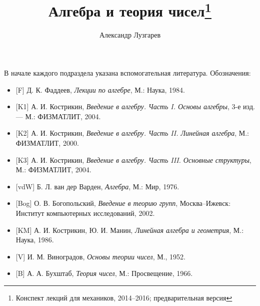 \documentclass[12pt]{article}
\theoremstyle{plain}
\theoremstyle{remark}
\theoremstyle{definition}
\begin{document}
\title{Алгебра и теория чисел\footnote{Конспект
    лекций для механиков, 2014--2016; предварительная
    версия}}
\author{Александр Лузгарев}
\date{}

\maketitle

\tableofcontents

\vfill

В начале каждого подраздела указана вспомогательная
литература. Обозначения:

\begin{itemize}
\item {}[F] Д. К. Фаддеев, {\it Лекции по алгебре}, М.: Наука, 1984.
\item {}[K1] А. И. Кострикин, {\it Введение в алгебру. Часть I. Основы
    алгебры}, 3-е изд. --- М.: ФИЗМАТЛИТ, 2004.
\item {}[K2] А. И. Кострикин, {\it Введение в алгебру. Часть II. Линейная
    алгебра}, М.: ФИЗМАТЛИТ, 2000.
\item {}[K3] А. И. Кострикин, {\it Введение в алгебру. Часть
    III. Основные структуры}, М.: ФИЗ\-МАТЛИТ, 2004.
\item {}[vdW] Б. Л. ван дер Варден, {\it Алгебра}, М.: Мир, 1976.
\item {}[Bog] О. В. Богопольский, {\it Введение в теорию групп},
  Москва--Ижевск: Институт компьютерных исследований, 2002.
\item {}[KM] А. И. Кострикин, Ю. И. Манин, {\it Линейная алгебра и
    геометрия}, М.: Наука, 1986.
\item {}[V] И. М. Виноградов, {\it Основы теории чисел}, М., 1952.
\item {}[B] А. А. Бухштаб, {\it Теория чисел}, М.: Просвещение, 1966.
\end{itemize}


\vfill\eject













\clearpage
{}

\end{document}
